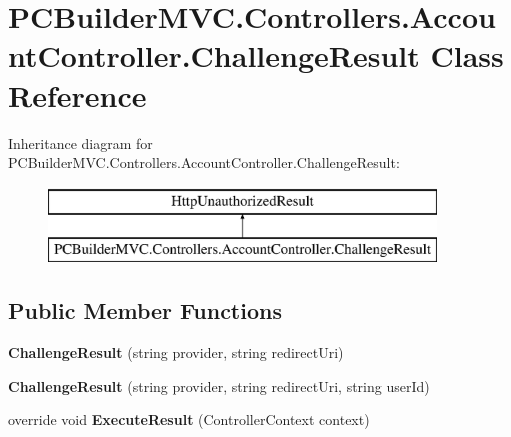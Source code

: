 \hypertarget{class_p_c_builder_m_v_c_1_1_controllers_1_1_account_controller_1_1_challenge_result}{}\section{P\+C\+Builder\+M\+V\+C.\+Controllers.\+Account\+Controller.\+Challenge\+Result Class Reference}
\label{class_p_c_builder_m_v_c_1_1_controllers_1_1_account_controller_1_1_challenge_result}
Inheritance diagram for P\+C\+Builder\+M\+V\+C.\+Controllers.\+Account\+Controller.\+Challenge\+Result\+:\begin{figure}[H]
\begin{center}
\leavevmode
\includegraphics[height=2.000000cm]{class_p_c_builder_m_v_c_1_1_controllers_1_1_account_controller_1_1_challenge_result}
\end{center}
\end{figure}
\subsection*{Public Member Functions}
\begin{DoxyCompactItemize}
\item 
{\bfseries Challenge\+Result} (string provider, string redirect\+Uri)\hypertarget{class_p_c_builder_m_v_c_1_1_controllers_1_1_account_controller_1_1_challenge_result_a78cfcbf7db59c5e894ee96c209afc93c}{}\label{class_p_c_builder_m_v_c_1_1_controllers_1_1_account_controller_1_1_challenge_result_a78cfcbf7db59c5e894ee96c209afc93c}

\item 
{\bfseries Challenge\+Result} (string provider, string redirect\+Uri, string user\+Id)\hypertarget{class_p_c_builder_m_v_c_1_1_controllers_1_1_account_controller_1_1_challenge_result_a2a6e6c2056b0b9ace59f8cc2e0357a64}{}\label{class_p_c_builder_m_v_c_1_1_controllers_1_1_account_controller_1_1_challenge_result_a2a6e6c2056b0b9ace59f8cc2e0357a64}

\item 
override void {\bfseries Execute\+Result} (Controller\+Context context)\hypertarget{class_p_c_builder_m_v_c_1_1_controllers_1_1_account_controller_1_1_challenge_result_ab13dcc9d19f257e306f78f7e96e3fcd1}{}\label{class_p_c_builder_m_v_c_1_1_controllers_1_1_account_controller_1_1_challenge_result_ab13dcc9d19f257e306f78f7e96e3fcd1}

\end{DoxyCompactItemize}
